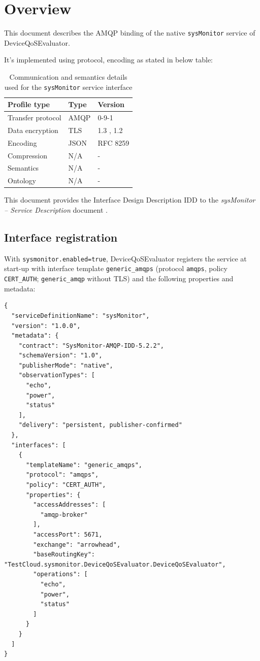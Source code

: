\documentclass[a4paper]{arrowhead}
\begin{document}
\section{Overview}
\label{sec:overview}

This document describes the AMQP binding of the native \texttt{sysMonitor} service of DeviceQoSEvaluator.

It's implemented using protocol, encoding as stated in below table:
\begin{table}[ht!]
  \centering
  \begin{tabular}{|l|l|l|}
    \hline
    \rowcolor{gray!33} Profile type & Type & Version \\ \hline
    Transfer protocol & AMQP & 0-9-1 \cite{amqp091} \\ \hline
    Data encryption & TLS & 1.3 \cite{rfc8446}, 1.2 \cite{rfc5246} \\ \hline
    Encoding & JSON & RFC 8259 \cite{rfc8259} \\ \hline
    Compression & N/A & - \\ \hline
    Semantics & N/A & - \\ \hline
    Ontology & N/A & - \\ \hline
  \end{tabular}
  \caption{Communication and semantics details used for the \texttt{sysMonitor} service interface}
  \label{tab:comunication_semantics_profile}
\end{table}

This document provides the Interface Design Description IDD to the \textit{sysMonitor -- Service Description} document \cite{dqe-sysMonitor-sd}.

\subsection{Interface registration}

With \texttt{sysmonitor.enabled=true}, DeviceQoSEvaluator registers the service at start-up with interface template \texttt{generic\_\allowbreak{}amqps} (protocol \texttt{amqps}, policy \texttt{CERT\_\allowbreak{}AUTH}; \texttt{generic\_\allowbreak{}amqp} without TLS) and the following properties and metadata:

\begin{lstlisting}[caption={Registered service instance (TestCloud).}]
{
  "serviceDefinitionName": "sysMonitor",
  "version": "1.0.0",
  "metadata": {
    "contract": "SysMonitor-AMQP-IDD-5.2.2",
    "schemaVersion": "1.0",
    "publisherMode": "native",
    "observationTypes": [
      "echo",
      "power",
      "status"
    ],
    "delivery": "persistent, publisher-confirmed"
  },
  "interfaces": [
    {
      "templateName": "generic_amqps",
      "protocol": "amqps",
      "policy": "CERT_AUTH",
      "properties": {
        "accessAddresses": [
          "amqp-broker"
        ],
        "accessPort": 5671,
        "exchange": "arrowhead",
        "baseRoutingKey": "TestCloud.sysmonitor.DeviceQoSEvaluator.DeviceQoSEvaluator",
        "operations": [
          "echo",
          "power",
          "status"
        ]
      }
    }
  ]
}
\end{lstlisting}
\end{document}
